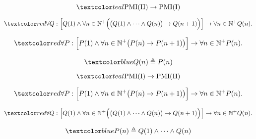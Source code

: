 \begin{frame}{}
  \[
    \teal{\text{PMI(II)} \to \text{PMI(I)}}
  \]

  \[
    \red{\forall Q:}\; 
    \Big[ Q(1) \land \forall n \in \mathbb{N}^{+} \Big(\big(Q(1) \land \cdots \land Q(n)\big) \to Q(n+1) \Big) \Big] 
      \to \forall n \in \mathbb{N}^{+} Q(n).
  \]

  \[
    \red{\forall P:}\; 
    \Big[ P(1) \land \forall n \in \mathbb{N}^{+} \big(P(n) \to P(n+1) \big) \Big]
      \to \forall n \in \mathbb{N}^{+} P(n).
  \]

  \pause
  \[
    \blue{Q(n) \triangleq P(n)}
  \]
\end{frame}

\begin{frame}{}
  \[
    \teal{\text{PMI(I)} \to \text{PMI(II)}}
  \]

  \[
    \red{\forall P:}\; 
    \Big[ P(1) \land \forall n \in \mathbb{N}^{+} \big(P(n) \to P(n+1) \big) \Big]
      \to \forall n \in \mathbb{N}^{+} P(n).
  \]

  \[
    \red{\forall Q:}\; 
    \Big[ Q(1) \land \forall n \in \mathbb{N}^{+} \Big(\big(Q(1) \land \cdots \land Q(n)\big) \to Q(n+1) \Big) \Big] 
      \to \forall n \in \mathbb{N}^{+} Q(n).
  \]

  \pause
  \[
    \blue{P(n) \triangleq Q(1) \land \cdots \land Q(n)}
  \]
\end{frame}

\begin{frame}{}
\end{frame}

% 
% 

